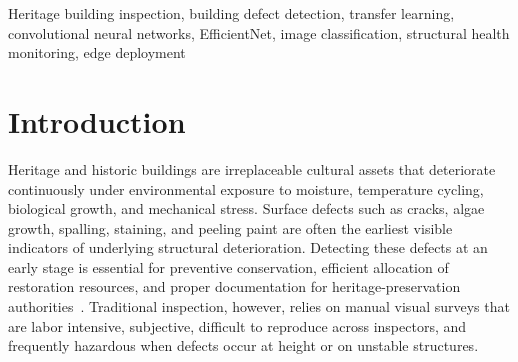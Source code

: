 \documentclass[conference]{IEEEtran}
\begin{document}
\begin{abstract}
Heritage buildings are irreplaceable cultural assets whose surface defects, if left undetected, accelerate structural deterioration. Manual inspection of these defects is labor intensive, subjective, and often hazardous. This paper presents a systematic transfer-learning benchmark of five convolutional neural network (CNN) architectures---EfficientNet-B0, ResNet-18, EfficientNet-V2-S, DenseNet-121, and MobileNet-V2---for classifying seven surface-defect categories on the publicly available BD3 building-defect dataset (3{,}965 images). Using ImageNet-pretrained backbones, a strong data-augmentation pipeline, and a reproducible training protocol, EfficientNet-B0 attains the highest test accuracy of 93.46\% (95\% Wilson confidence interval $\pm2.0$) and a macro-averaged F1-score of 0.936 with only 4.02M parameters, while all five models exceed 91\% accuracy and a macro-averaged area under the receiver operating characteristic curve of at least 0.993. On the same dataset---which spans both heritage and ordinary facades---our EfficientNet-B0 is on par with the strongest model reported by the original BD3 benchmark under its non-augmented setting (a Vision Transformer, macro-F1 0.932) while using roughly an order of magnitude fewer parameters. We frame this as parameter-efficiency parity rather than a win, because the two studies differ in data split and augmentation protocol and the difference lies within single-run sampling noise. These results indicate that compact, ImageNet-pretrained CNNs offer an accurate and computationally efficient basis for automated building-defect detection that is well suited to resource-constrained edge deployment.
\end{abstract}

\begin{IEEEkeywords}
Heritage building inspection, building defect detection, transfer learning, convolutional neural networks, EfficientNet, image classification, structural health monitoring, edge deployment
\end{IEEEkeywords}

\section{Introduction}
Heritage and historic buildings are irreplaceable cultural assets that deteriorate continuously under environmental exposure to moisture, temperature cycling, biological growth, and mechanical stress. Surface defects such as cracks, algae growth, spalling, staining, and peeling paint are often the earliest visible indicators of underlying structural deterioration. Detecting these defects at an early stage is essential for preventive conservation, efficient allocation of restoration resources, and proper documentation for heritage-preservation authorities~\cite{ref1}. Traditional inspection, however, relies on manual visual surveys that are labor intensive, subjective, difficult to reproduce across inspectors, and frequently hazardous when defects occur at height or on unstable structures.
\end{document}
